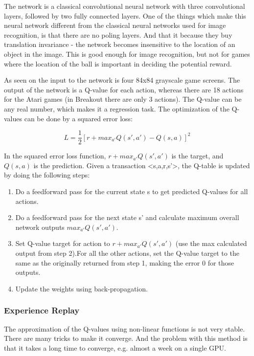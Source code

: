 The network is a classical convolutional neural network with three convolutional layers, followed by two fully connected layers. One of the things which make this neural network different from the classical neural networks used for image recognition, is that there are no poling layers. And that it because they buy translation invariance -  the network becomes insensitive to the location of an object in the image. This is good enough for image recognition, but not for games where the location of the ball is important in deciding the potential reward.

As seen on  the input to the network is four 84x84 grayscale game screens. The output of the network is a Q-value for each action, whereas there are 18 actions for the Atari games (in Breakout there are only 3 actions). The Q-value can be any real number, which makes it a regression task. The optimization of the Q-values can be done by a squared error loss:

\begin{equation}
L=\frac{1}{2}[r+max_{a'}Q(s',a')-Q(s,a)]^2
\end{equation}  

In the squared error loss function, $r+max_{a'}Q(s',a')$ is the target, and $Q(s,a)$ is the prediction. Given a transaction <s,a,r,s'>, the Q-table is updated by doing the following steps:
\begin{enumerate}
	\item Do a feedforward pass for the current state s to get predicted Q-values for all actions.
	\item Do a feedforward pass for the next state s’ and calculate maximum overall network outputs $max_{a'}Q(s',a')$.
	\item Set Q-value target for action to $r+max_{a'}Q(s',a')$ (use the max calculated output from step 2).For all the other actions, set the Q-value target to the same as the originally returned from step 1, making the error 0 for those outputs. 
	\item Update the weights using back-propagation.
\end{enumerate}

\subsubsection{Experience Replay}
The approximation of the Q-values using non-linear functions is not very stable. There are many tricks to make it converge. And the problem with this method is that it takes a long time to converge, e.g. almost a week on a single GPU.  

